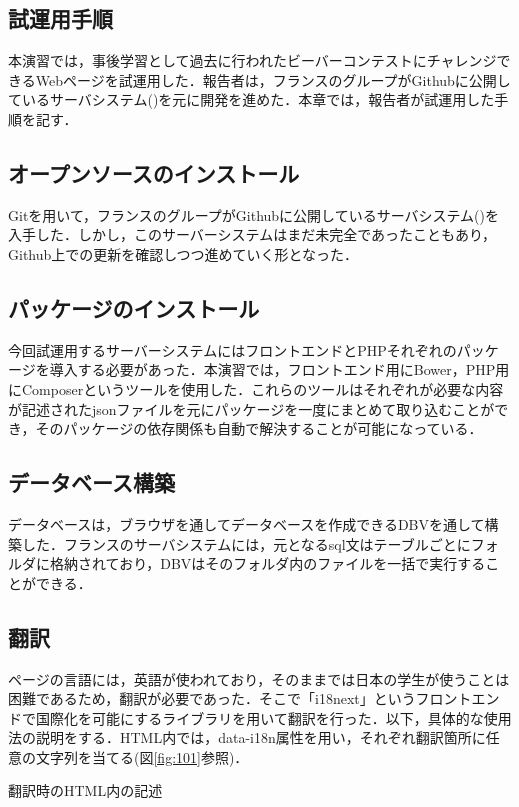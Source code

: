 \documentclass[a4paper]{jarticle}
\makeatletter
\newenvironment{figurehere}
  {\def\@captype{figure}}
  {}
\makeatother
\begin{document}
\begin{multicols}{2}
\fi	%

\section{試運用手順}
本演習では，事後学習として過去に行われたビーバーコンテストにチャレンジできるWebページを試運用した．報告者は，フランスのグループがGithubに公開しているサーバシステム(\cite{bebras-france-platform})を元に開発を進めた．本章では，報告者が試運用した手順を記す．
\subsection{オープンソースのインストール}
Gitを用いて，フランスのグループがGithubに公開しているサーバシステム(\cite{bebras-france-platform})を入手した．しかし，このサーバーシステムはまだ未完全であったこともあり，Github上での更新を確認しつつ進めていく形となった．

\subsection{パッケージのインストール}
今回試運用するサーバーシステムにはフロントエンドとPHPそれぞれのパッケージを導入する必要があった．本演習では，フロントエンド用にBower，PHP用にComposerというツールを使用した．これらのツールはそれぞれが必要な内容が記述されたjsonファイルを元にパッケージを一度にまとめて取り込むことができ，そのパッケージの依存関係も自動で解決することが可能になっている．

\subsection{データベース構築}
データベースは，ブラウザを通してデータベースを作成できるDBVを通して構築した．フランスのサーバシステムには，元となるsql文はテーブルごとにフォルダに格納されており，DBVはそのフォルダ内のファイルを一括で実行することができる．

\subsection{翻訳}
ページの言語には，英語が使われており，そのままでは日本の学生が使うことは困難であるため，翻訳が必要であった．そこで「i18next」というフロントエンドで国際化を可能にするライブラリを用いて翻訳を行った．以下，具体的な使用法の説明をする．HTML内では，data-i18n属性を用い，それぞれ翻訳箇所に任意の文字列を当てる(図\ref{fig:101}参照)．

\begin{figurehere}
\begin{center}
\end{center}
\caption{翻訳時のHTML内の記述}\label{fig:101}
\end{figurehere}


\end{multicols}
\end{document}
